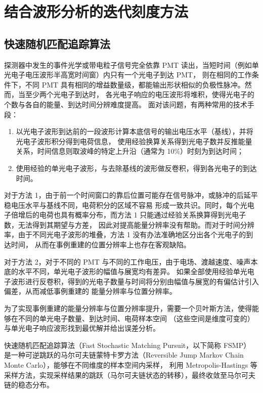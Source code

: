 
\chapter{结合波形分析的迭代刻度方法}

\section{快速随机匹配追踪算法}\label{sec:fsmp}
探测器中发生的事件光学或带电粒子信号完全依靠 PMT 读出，当短时间（例如单光电子电压波形半高宽时间窗）内只有一个光电子到达 PMT，
则在相同的工作条件下，不同 PMT 具有相同的增益数量级，都能输出形状相似的负极性脉冲。然而，当至少两个光电子到达时，
各光电子响应的电压波形将堆积，使得光电子的个数与各自的能量、到达时间分辨难度提高。
面对该问题，有两种常用的技术手段：
\begin{enumerate}
    \item 以光电子波形到达前的一段波形计算本底信号的输出电压水平（基线），并将光电子波形积分得到电荷信息，
    使用经验换算关系得到光电子数并反推能量关系，时间信息则取波峰的特定上升沿（通常为 10\%）时刻为到达时间；
    \item 使用经验的单光电子波形，与去除基线的波形做反卷积，得到各光电子的到达时间。
\end{enumerate}

对于方法 1，由于前一个时间窗口的靠后位置可能存在信号脉冲，或脉冲的后延平稳电压水平与基线不同，电荷积分的区域不容易
形成一致共识。同时，每个光电子倍增后的电荷也具有概率分布，而方法 1 只能通过经验关系换算得到光电子数，无法得到其期望与方差，
因此对提高能量分辨率没有帮助。而对于时间分辨率，由于不同光电子波形的堆叠，方法 1 没有办法准确地区分出各个光电子的到达时间，
从而在事例重建的位置分辨率上也存在客观缺陷。

对于方法 2，对于不同的 PMT 与不同的工作电压，由于电场、渡越速度、噪声本底的水平不同，单光电子波形的幅值与展宽均有差异。
如果全部使用经验单光电子波形进行反卷积，得到的光电子数量与时间将分别由幅值与展宽的有偏估计引入偏差，从而减低事例重建的
能量分辨率与位置分辨率。

为了实现事例重建的能量分辨率与位置分辨率提升，需要一个贝叶斯方法，使得能够在不同的单光电子数量、到达时间、电荷样本空间
（这些空间是维度可变的）与单光电子响应波形找到最优解并给出误差分析。

快速随机匹配追踪算法（Fast Stochastic Matching Pursuit，以下简称 FSMP）\cite{wangFastStochasticMatching2024a}
是一种可逆跳跃的马尔可夫链蒙特卡罗方法（Reversible Jump Markov Chain Monte Carlo），能够在不同维度的样本空间内采样，
利用 Metropolis-Hastings 等采样方法，实现采样结果的跳跃（马尔可夫链状态的转移），最终收敛至马尔可夫链的稳态分布。


